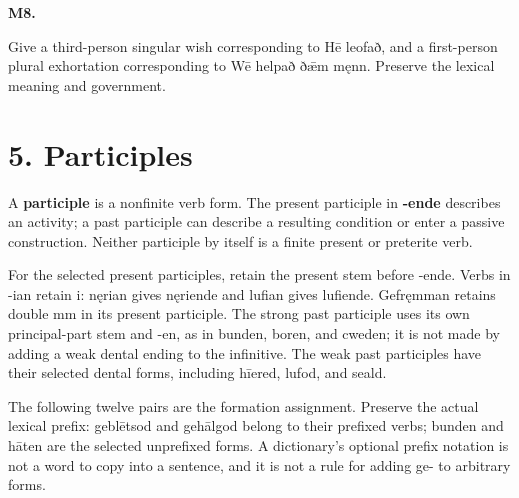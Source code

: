\par\begin{minipage}{\linewidth}\raggedright
\textbf{M8.}

Give a third-person singular wish corresponding to Hē leofað, and a first-person plural exhortation corresponding to Wē helpað ðǣm męnn. Preserve the lexical meaning and government.

\end{minipage}\par\addvspace{4pt}

\section*{5. Participles}

A \textbf{participle} is a nonfinite verb form. The present participle in \textbf{-ende} describes an activity; a past participle can describe a resulting condition or enter a passive construction. Neither participle by itself is a finite present or preterite verb.

For the selected present participles, retain the present stem before -ende. Verbs in -ian retain i: nęrian gives nęriende and lufian gives lufiende. Gefręmman retains double mm in its present participle. The strong past participle uses its own principal-part stem and -en, as in bunden, boren, and cweden; it is not made by adding a weak dental ending to the infinitive. The weak past participles have their selected dental forms, including hīered, lufod, and seald.

The following twelve pairs are the formation assignment. Preserve the actual lexical prefix: geblētsod and gehālgod belong to their prefixed verbs; bunden and hāten are the selected unprefixed forms. A dictionary’s optional prefix notation is not a word to copy into a sentence, and it is not a rule for adding ge- to arbitrary forms.

